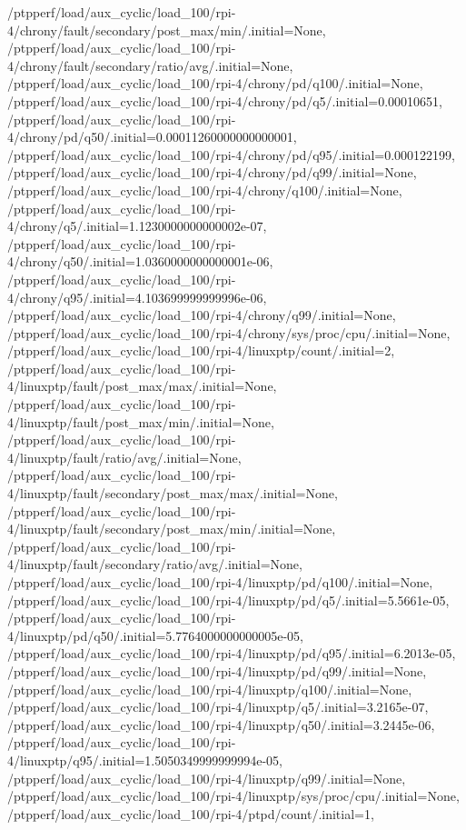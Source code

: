 {    /ptpperf/load/aux_cyclic/load_100/rpi-4/chrony/fault/secondary/post_max/min/.initial=None,
    /ptpperf/load/aux_cyclic/load_100/rpi-4/chrony/fault/secondary/ratio/avg/.initial=None,
    /ptpperf/load/aux_cyclic/load_100/rpi-4/chrony/pd/q100/.initial=None,
    /ptpperf/load/aux_cyclic/load_100/rpi-4/chrony/pd/q5/.initial=0.00010651,
    /ptpperf/load/aux_cyclic/load_100/rpi-4/chrony/pd/q50/.initial=0.00011260000000000001,
    /ptpperf/load/aux_cyclic/load_100/rpi-4/chrony/pd/q95/.initial=0.000122199,
    /ptpperf/load/aux_cyclic/load_100/rpi-4/chrony/pd/q99/.initial=None,
    /ptpperf/load/aux_cyclic/load_100/rpi-4/chrony/q100/.initial=None,
    /ptpperf/load/aux_cyclic/load_100/rpi-4/chrony/q5/.initial=1.1230000000000002e-07,
    /ptpperf/load/aux_cyclic/load_100/rpi-4/chrony/q50/.initial=1.0360000000000001e-06,
    /ptpperf/load/aux_cyclic/load_100/rpi-4/chrony/q95/.initial=4.103699999999996e-06,
    /ptpperf/load/aux_cyclic/load_100/rpi-4/chrony/q99/.initial=None,
    /ptpperf/load/aux_cyclic/load_100/rpi-4/chrony/sys/proc/cpu/.initial=None,
    /ptpperf/load/aux_cyclic/load_100/rpi-4/linuxptp/count/.initial=2,
    /ptpperf/load/aux_cyclic/load_100/rpi-4/linuxptp/fault/post_max/max/.initial=None,
    /ptpperf/load/aux_cyclic/load_100/rpi-4/linuxptp/fault/post_max/min/.initial=None,
    /ptpperf/load/aux_cyclic/load_100/rpi-4/linuxptp/fault/ratio/avg/.initial=None,
    /ptpperf/load/aux_cyclic/load_100/rpi-4/linuxptp/fault/secondary/post_max/max/.initial=None,
    /ptpperf/load/aux_cyclic/load_100/rpi-4/linuxptp/fault/secondary/post_max/min/.initial=None,
    /ptpperf/load/aux_cyclic/load_100/rpi-4/linuxptp/fault/secondary/ratio/avg/.initial=None,
    /ptpperf/load/aux_cyclic/load_100/rpi-4/linuxptp/pd/q100/.initial=None,
    /ptpperf/load/aux_cyclic/load_100/rpi-4/linuxptp/pd/q5/.initial=5.5661e-05,
    /ptpperf/load/aux_cyclic/load_100/rpi-4/linuxptp/pd/q50/.initial=5.7764000000000005e-05,
    /ptpperf/load/aux_cyclic/load_100/rpi-4/linuxptp/pd/q95/.initial=6.2013e-05,
    /ptpperf/load/aux_cyclic/load_100/rpi-4/linuxptp/pd/q99/.initial=None,
    /ptpperf/load/aux_cyclic/load_100/rpi-4/linuxptp/q100/.initial=None,
    /ptpperf/load/aux_cyclic/load_100/rpi-4/linuxptp/q5/.initial=3.2165e-07,
    /ptpperf/load/aux_cyclic/load_100/rpi-4/linuxptp/q50/.initial=3.2445e-06,
    /ptpperf/load/aux_cyclic/load_100/rpi-4/linuxptp/q95/.initial=1.5050349999999994e-05,
    /ptpperf/load/aux_cyclic/load_100/rpi-4/linuxptp/q99/.initial=None,
    /ptpperf/load/aux_cyclic/load_100/rpi-4/linuxptp/sys/proc/cpu/.initial=None,
    /ptpperf/load/aux_cyclic/load_100/rpi-4/ptpd/count/.initial=1,
}
